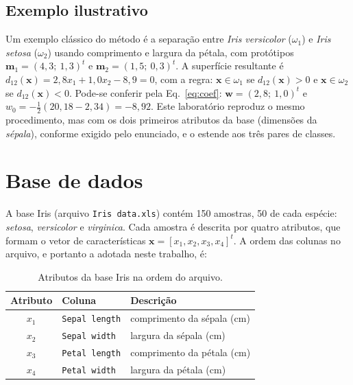 \documentclass[12pt,a4paper]{article}
\begin{document}
\subsection{Exemplo ilustrativo}

Um exemplo clássico do método é a separação entre \emph{Iris versicolor} ($\omega_1$) e \emph{Iris setosa} ($\omega_2$) usando comprimento e largura da pétala, com protótipos $\mathbf{m}_1 = (4{,}3;\ 1{,}3)^t$ e $\mathbf{m}_2 = (1{,}5;\ 0{,}3)^t$. A superfície resultante é $d_{12}(\mathbf{x}) = 2{,}8x_1 + 1{,}0x_2 - 8{,}9 = 0$, com a regra: $\mathbf{x} \in \omega_1$ se $d_{12}(\mathbf{x}) > 0$ e $\mathbf{x} \in \omega_2$ se $d_{12}(\mathbf{x}) < 0$. Pode-se conferir pela Eq.~\eqref{eq:coef}: $\mathbf{w} = (2{,}8;\ 1{,}0)^t$ e $w_0 = -\tfrac{1}{2}(20{,}18 - 2{,}34) = -8{,}92$. Este laboratório reproduz o mesmo procedimento, mas com os dois primeiros atributos da base (dimensões da \emph{sépala}), conforme exigido pelo enunciado, e o estende aos três pares de classes.

\section{Base de dados}

A base Iris (arquivo \texttt{Iris data.xls}) contém 150 amostras, 50 de cada espécie: \emph{setosa}, \emph{versicolor} e \emph{virginica}. Cada amostra é descrita por quatro atributos, que formam o vetor de características $\mathbf{x} = [x_1, x_2, x_3, x_4]^t$. A ordem das colunas no arquivo, e portanto a adotada neste trabalho, é:

\begin{table}[H]
\centering
\caption{Atributos da base Iris na ordem do arquivo.}
\begin{tabular}{cll}
\toprule
Atributo & Coluna & Descrição \\
\midrule
$x_1$ & \texttt{Sepal length} & comprimento da sépala (cm) \\
$x_2$ & \texttt{Sepal width}  & largura da sépala (cm) \\
$x_3$ & \texttt{Petal length} & comprimento da pétala (cm) \\
$x_4$ & \texttt{Petal width}  & largura da pétala (cm) \\
\bottomrule
\end{tabular}
\end{table}
\end{document}
